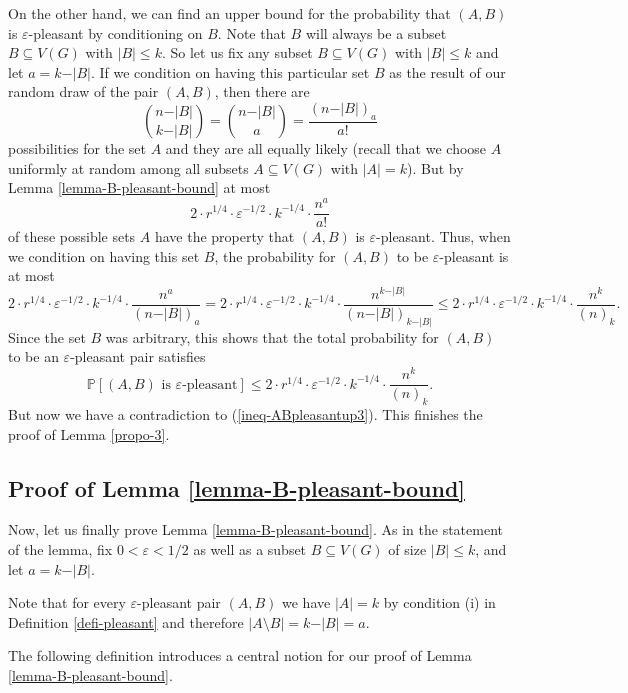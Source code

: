 On the other hand, we can find an upper bound for the probability that $(A,B)$ is $\varepsilon$-pleasant by conditioning on $B$. Note that $B$ will always be a subset $B\subseteq V(G)$ with $\vert B\vert \leq k$. So let us fix any subset $B\subseteq V(G)$ with $\vert B\vert \leq k$ and let $a=k-\vert B\vert$. If we condition on having this particular set $B$ as the result of our random draw of the pair $(A,B)$, then there are
\[{n-\vert B\vert\choose k-\vert B\vert}={n-\vert B\vert\choose a}=\frac{(n-\vert B\vert)_a}{a!}\]
possibilities for the set $A$ and they are all equally likely (recall that we choose $A$ uniformly at random among all subsets $A\subseteq V(G)$ with $\vert A\vert=k$). But by Lemma \ref{lemma-B-pleasant-bound} at most
\[2\cdot r^{1/4}\cdot \varepsilon^{-1/2}\cdot k^{-1/4}\cdot \frac{n^a}{a!}\]
of these possible sets $A$ have the property that $(A,B)$ is $\varepsilon$-pleasant. Thus, when we condition on having this set $B$, the probability for $(A,B)$ to be $\varepsilon$-pleasant  is at most
\[2\cdot r^{1/4}\cdot \varepsilon^{-1/2}\cdot k^{-1/4}\cdot \frac{n^a}{(n-\vert B\vert)_a}=
2\cdot r^{1/4}\cdot \varepsilon^{-1/2}\cdot k^{-1/4}\cdot \frac{n^{k-\vert B\vert}}{(n-\vert B\vert)_{k-\vert B\vert}}
\leq 2\cdot r^{1/4}\cdot \varepsilon^{-1/2}\cdot k^{-1/4}\cdot \frac{n^k}{(n)_k}.\]
Since the set $B$ was arbitrary, this shows that the total probability for $(A,B)$ to be an $\varepsilon$-pleasant pair satisfies
\[\mathbb{P}[(A,B)\text{ is }\varepsilon\text{-pleasant}]\leq 2\cdot r^{1/4}\cdot \varepsilon^{-1/2}\cdot k^{-1/4}\cdot \frac{n^k}{(n)_k}.\]
But now we have a contradiction to (\ref{ineq-ABpleasantup3}). This finishes the proof of Lemma \ref{propo-3}.

\subsection{Proof of Lemma \ref{lemma-B-pleasant-bound}}

Now, let us finally prove Lemma \ref{lemma-B-pleasant-bound}. As in the statement of the lemma, fix $0<\varepsilon<1/2$ as well as a subset $B\subseteq V(G)$ of size $\vert B\vert\leq k$, and let $a=k-\vert B\vert$.

Note that for every $\varepsilon$-pleasant pair $(A,B)$ we have $\vert A\vert=k$ by condition (i) in Definition \ref{defi-pleasant} and therefore $\vert A\setminus B\vert=k-\vert B\vert=a$.

The following definition introduces a central notion for our proof of Lemma \ref{lemma-B-pleasant-bound}.

